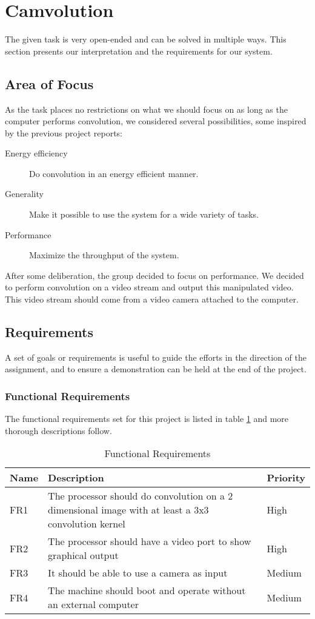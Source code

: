 \section{Camvolution}
The given task is very open-ended and can be solved in multiple ways.
This section presents our interpretation and the requirements for our system.

\subsection{Area of Focus}
As the task places no restrictions on what we should focus on as long as the computer performs convolution, we considered several possibilities, some inspired by the previous project reports:

\begin{description}
    \item[Energy efficiency] Do convolution in an energy efficient manner.
    \item[Generality] Make it possible to use the system for a wide variety of tasks.
    \item[Performance] Maximize the throughput of the system.
\end{description}

After some deliberation,
the group decided to focus on performance.
We decided to perform convolution on a video stream and output this manipulated video.
This video stream should come from a video camera attached to the computer.

\subsection{Requirements}
A set of goals or requirements is useful to guide the efforts in the direction of the assignment, and to ensure a demonstration can be held at the end of the project.

\subsubsection{Functional Requirements}
The functional requirements set for this project is listed in table \ref{tab:FunctionalRequirements} and more thorough descriptions follow.

\begin{table}[h]
    \centering
    \begin{tabular}{lp{12cm}l}
        Name & Description & Priority \\
        \hline
        FR1 &
            The processor should do convolution on a 2 dimensional image with at least a 3x3 convolution kernel &
            High \\
        FR2 &
            The processor should have a video port to show graphical output &
            High \\
        FR3 &
            It should be able to use a camera as input &
            Medium \\
        FR4 &
            The machine should boot and operate without an external computer &
            Medium
    \end{tabular}
    \caption{Functional Requirements}
    \label{tab:FunctionalRequirements}
\end{table}

